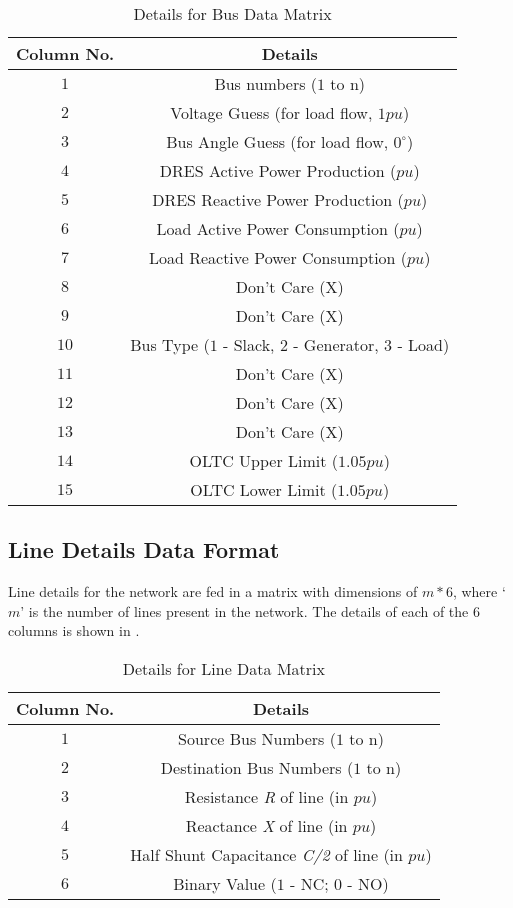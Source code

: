 \begin{table}[H]
\centering
\begin{tabular}{cc}
\rowcolor{gray!25}
\textbf{Column No.} & \textbf{Details}\\
\hline
$1$ & Bus numbers ($1$ to n)\\
\rowcolor{gray!15}
$2$ & Voltage Guess (for load flow, $1pu$)\\
$3$ & Bus Angle Guess (for load flow, $0^{\circ}$)\\
\rowcolor{gray!15}
$4$ & DRES Active Power Production ($pu$)\\
$5$ & DRES Reactive Power Production ($pu$)\\
\rowcolor{gray!15}
$6$ & Load Active Power Consumption ($pu$)\\
$7$ & Load Reactive Power Consumption ($pu$)\\
\rowcolor{gray!15}
$8$ & Don't Care (X)\\
$9$ & Don't Care (X)\\
\rowcolor{gray!15}
$10$ & Bus Type ($1$ - Slack, $2$ - Generator, $3$ - Load)\\
$11$ & Don't Care (X)\\
\rowcolor{gray!15}
$12$ & Don't Care (X)\\
$13$ & Don't Care (X)\\
\rowcolor{gray!15}
$14$ & OLTC Upper Limit ($1.05pu$)\\
$15$ & OLTC Lower Limit ($1.05pu$)\\
\hline
\end{tabular}
\caption{Details for Bus Data Matrix}
\end{table}

\subsection*{Line Details Data Format}
Line details for the network are fed in a matrix with dimensions of $m*6$, where `$m$' is the number of lines present in the network. The details of each of the $6$ columns is shown in .

\begin{table}[H]
\centering
\begin{tabular}{cc}
\rowcolor{gray!25}
\textbf{Column No.} & \textbf{Details}\\
\hline
$1$ & Source Bus Numbers ($1$ to n)\\
\rowcolor{gray!15}
$2$ & Destination Bus Numbers ($1$ to n)\\
$3$ & Resistance \emph{R} of line (in $pu$)\\
\rowcolor{gray!15}
$4$ & Reactance \emph{X} of line (in $pu$)\\
$5$ & Half Shunt Capacitance \emph{C/2} of line (in $pu$)\\
\rowcolor{gray!15}
$6$ & Binary Value ($1$ - NC; $0$ - NO)\\
\hline
\end{tabular}
\caption{Details for Line Data Matrix}
\end{table}

